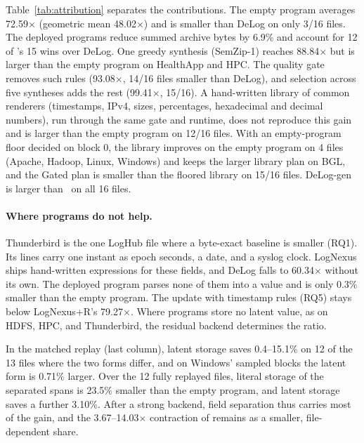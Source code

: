 Table~\ref{tab:attribution} separates the contributions. The empty program averages 72.59$\times$ (geometric mean 48.02$\times$) and is smaller than DeLog on only 3/16 files. The deployed programs reduce summed archive bytes by 6.9\% and account for 12 of \tool's 15 wins over DeLog. One greedy synthesis (SemZip-1) reaches 88.84$\times$ but is larger than the empty program on HealthApp and HPC. The quality gate removes such rules (93.08$\times$, 14/16 files smaller than DeLog), and selection across five syntheses adds the rest (99.41$\times$, 15/16).
A hand-written library of common renderers (timestamps, IPv4, sizes, percentages, hexadecimal and decimal numbers), run through the same gate and runtime, does not reproduce this gain and is larger than the empty program on 12/16 files. With an empty-program floor decided on block 0, the library improves on the empty program on 4 files (Apache, Hadoop, Linux, Windows) and keeps the larger library plan on BGL, and the Gated plan is smaller than the floored library on 15/16 files. DeLog-gen is larger than \tool\ on all 16 files.
\paragraph{Where programs do not help.} Thunderbird is the one LogHub file where a byte-exact baseline is smaller (RQ1). Its lines carry one instant as epoch seconds, a date, and a syslog clock. LogNexus ships hand-written expressions for these fields, and DeLog falls to 60.34$\times$ without its own. The deployed program parses none of them into a value and is only 0.3\% smaller than the empty program. The update with timestamp rules (RQ5) stays below LogNexus+R's 79.27$\times$. Where programs store no latent value, as on HDFS, HPC, and Thunderbird, the residual backend determines the ratio.

In the matched replay (last column), latent storage saves 0.4--15.1\% on 12 of the 13 files where the two forms differ, and on Windows' sampled blocks the latent form is 0.71\% larger. Over the 12 fully replayed files, literal storage of the separated spans is 23.5\% smaller than the empty program, and latent storage saves a further 3.10\%. After a strong backend, field separation thus carries most of the gain, and the 3.67--14.03$\times$ contraction of  remains as a smaller, file-dependent share.
